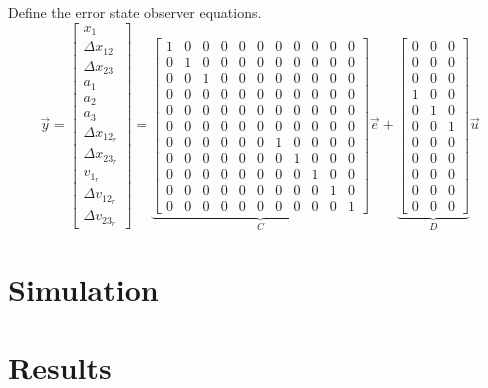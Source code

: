 \documentclass[12pt,onecolumn,reqno]{amsart}
\begin{document}
Define the error state observer equations.
\begin{equation}
  \vec{y} = 
  \begin{bmatrix}
    x_{1}             \\
    \Delta x_{12}     \\
    \Delta x_{23}     \\
    a_{1}             \\
    a_{2}             \\
    a_{3}             \\
    \Delta x_{12_{r}} \\
    \Delta x_{23_{r}} \\
    v_{1_{r}}         \\
    \Delta v_{12_{r}} \\
    \Delta v_{23_{r}}
  \end{bmatrix}
  =
  \underbrace{
  \begin{bmatrix}
    1 & 0 & 0 & 0 & 0 & 0 & 0 & 0 & 0 & 0 & 0 \\
    0 & 1 & 0 & 0 & 0 & 0 & 0 & 0 & 0 & 0 & 0 \\
    0 & 0 & 1 & 0 & 0 & 0 & 0 & 0 & 0 & 0 & 0 \\
    0 & 0 & 0 & 0 & 0 & 0 & 0 & 0 & 0 & 0 & 0 \\
    0 & 0 & 0 & 0 & 0 & 0 & 0 & 0 & 0 & 0 & 0 \\
    0 & 0 & 0 & 0 & 0 & 0 & 0 & 0 & 0 & 0 & 0 \\
    0 & 0 & 0 & 0 & 0 & 0 & 1 & 0 & 0 & 0 & 0 \\
    0 & 0 & 0 & 0 & 0 & 0 & 0 & 1 & 0 & 0 & 0 \\
    0 & 0 & 0 & 0 & 0 & 0 & 0 & 0 & 1 & 0 & 0 \\
    0 & 0 & 0 & 0 & 0 & 0 & 0 & 0 & 0 & 1 & 0 \\
    0 & 0 & 0 & 0 & 0 & 0 & 0 & 0 & 0 & 0 & 1
  \end{bmatrix}
  }_{C}
  \vec{e}
  +
  \underbrace{
  \begin{bmatrix}
    0 & 0 & 0 \\
    0 & 0 & 0 \\
    0 & 0 & 0 \\
    1 & 0 & 0 \\
    0 & 1 & 0 \\
    0 & 0 & 1 \\
    0 & 0 & 0 \\
    0 & 0 & 0 \\
    0 & 0 & 0 \\
    0 & 0 & 0 \\
    0 & 0 & 0 
  \end{bmatrix}
  }_{D}
  \vec{u}
\end{equation}
\section{Simulation}


\section{Results}




\end{document}
